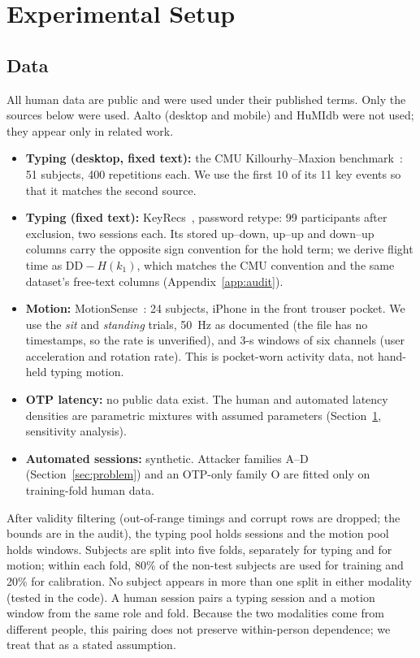 \documentclass[conference]{IEEEtran}
\begin{document}
\section{Experimental Setup}
\label{sec:exp}

\subsection{Data}
All human data are public and were used under their published terms. Only the sources below were used. Aalto (desktop and mobile) and HuMIdb were not used; they appear only in related work.
\begin{itemize}
\item \textbf{Typing (desktop, fixed text):} the CMU Killourhy--Maxion benchmark~\cite{killourhy2009}: 51 subjects, 400 repetitions each. We use the first 10 of its 11 key events so that it matches the second source.
\item \textbf{Typing (fixed text):} KeyRecs~\cite{dias2023keyrecs}, password retype: 99 participants after exclusion, two sessions each. Its stored up--down, up--up and down--up columns carry the opposite sign convention for the hold term; we derive flight time as $\text{DD}-H(k_1)$, which matches the CMU convention and the same dataset's free-text columns (Appendix~\ref{app:audit}).
\item \textbf{Motion:} MotionSense~\cite{malekzadeh2019}: 24 subjects, iPhone in the front trouser pocket. We use the \emph{sit} and \emph{standing} trials, 50~Hz as documented (the file has no timestamps, so the rate is unverified), and 3-s windows of six channels (user acceleration and rotation rate). This is pocket-worn activity data, not hand-held typing motion.
\item \textbf{OTP latency:} no public data exist. The human and automated latency densities are parametric mixtures with assumed parameters (Section~\ref{sec:exp}, sensitivity analysis).
\item \textbf{Automated sessions:} synthetic. Attacker families A--D (Section~\ref{sec:problem}) and an OTP-only family O are fitted only on training-fold human data.
\end{itemize}
After validity filtering (out-of-range timings and corrupt rows are dropped; the bounds are in the audit), the typing pool holds \TypKept{} sessions and the motion pool holds \MotWindows{} windows. Subjects are split into five folds, separately for typing and for motion; within each fold, 80\% of the non-test subjects are used for training and 20\% for calibration. No subject appears in more than one split in either modality (tested in the code). A human session pairs a typing session and a motion window from the same role and fold. Because the two modalities come from different people, this pairing does not preserve within-person dependence; we treat that as a stated assumption.
\end{document}
